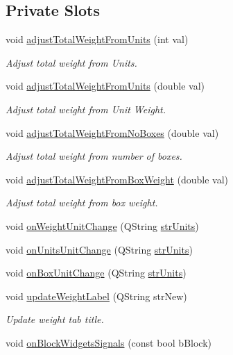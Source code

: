 \subsection*{Private Slots}
\begin{DoxyCompactItemize}
\item 
void \hyperlink{class_catch_input_ctrl_a84bac89a8b1731e8690859a0648b0f38}{adjustTotalWeightFromUnits} (int val)
\begin{DoxyCompactList}\small\item\em Adjust total weight from Units. \item\end{DoxyCompactList}\item 
void \hyperlink{class_catch_input_ctrl_af01aa84307b7bada61058771cfbac1a7}{adjustTotalWeightFromUnits} (double val)
\begin{DoxyCompactList}\small\item\em Adjust total weight from Unit Weight. \item\end{DoxyCompactList}\item 
void \hyperlink{class_catch_input_ctrl_ad524224bfc56dadce27bf72defa7ef32}{adjustTotalWeightFromNoBoxes} (double val)
\begin{DoxyCompactList}\small\item\em Adjust total weight from number of boxes. \item\end{DoxyCompactList}\item 
void \hyperlink{class_catch_input_ctrl_ac1ff61d816c6f708c176977c6b3b1e7b}{adjustTotalWeightFromBoxWeight} (double val)
\begin{DoxyCompactList}\small\item\em Adjust total weight from box weight. \item\end{DoxyCompactList}\item 
void \hyperlink{class_catch_input_ctrl_a05540b0a70693d26822081024ffec3b5}{onWeightUnitChange} (QString \hyperlink{catchinputctrl_8cpp_a40a45457a52d3c046f5b9322005ba5c5}{strUnits})
\item 
void \hyperlink{class_catch_input_ctrl_a39da14ffeffa2571fc437079debfae2f}{onUnitsUnitChange} (QString \hyperlink{catchinputctrl_8cpp_a40a45457a52d3c046f5b9322005ba5c5}{strUnits})
\item 
void \hyperlink{class_catch_input_ctrl_ad8cf089d6a877ba0471fdaf9bcaaea03}{onBoxUnitChange} (QString \hyperlink{catchinputctrl_8cpp_a40a45457a52d3c046f5b9322005ba5c5}{strUnits})
\item 
void \hyperlink{class_catch_input_ctrl_ab8e1629f9e58b12262a146f58d9309fe}{updateWeightLabel} (QString strNew)
\begin{DoxyCompactList}\small\item\em Update weight tab title. \item\end{DoxyCompactList}\item 
void \hyperlink{class_catch_input_ctrl_a0fe6e21b361de7336a2cdca8be6edb75}{onBlockWidgetsSignals} (const bool bBlock)
\end{DoxyCompactItemize}
